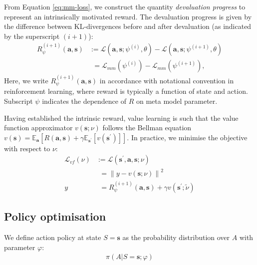 \documentclass[utf8]{frontiersSCNS}
\newcommand{\norm}[1]{\left\lVert#1\right\rVert}
\newcommand{\bs}{\boldsymbol}
\begin{document}
From Equation \ref{eq:mm-loss}, we construct the quantity {\it devaluation progress} to represent an intrinsically motivated reward. The devaluation progress is given by the difference between KL-divergences before and after devaluation (as indicated by the superscript $(i+1)$):
%
	\begin{equation}
	\begin{aligned} \label{eq:deval-prog}
	R_\psi^{(i+1)}(\bs{a}, \bs{s}) 
		&:= 
		\mathcal{L}(\bs{a}, \bs{s}; \psi^{(i)}, \theta) - 
		\mathcal{L}(\bs{a}, \bs{s}; \psi^{(i+1)}, \theta) \\
		&\phantom{:}=	
		\mathcal{L}_{mm}(\psi^{(i)}) - \mathcal{L}_{mm}(\psi^{(i+1)}),
	\end{aligned}
	\end{equation}
%
Here, we write $R_\psi^{(i+1)}(\bs{a}, \bs{s})$ in accordance with notational convention in reinforcement learning, where reward is typically a function of state and action. Subscript $\psi$ indicates the dependence of $R$ on meta model parameter.

Having established the intrinsic reward, value learning is such that the value function approximator $v (\bs{s}; \nu)$ follows the Bellman equation $v(\bs{s}) = \mathbb{E}_{\bs{a}}[R(\bs{a}, \bs{s}) + \gamma \mathbb{E}_{\bs{s}^\prime}[v(\bs{s}^\prime)]]$. In practice, we minimise the objective with respect to $\nu$:
%
	\begin{equation}
	\begin{aligned} \label{eq:vf-loss}
	\mathcal{L}_{vf}(\nu) 
		&:= 
		\mathcal{L}(\bs{s}^\prime, \bs{a}, \bs{s}; \nu) \\ 
		&\phantom{:}= 
		\norm{y - v(\bs{s}; \nu) }^2 \\
		y 
		&\phantom{:}= 
		R_\psi^{(i+1)}(\bs{a}, \bs{s}) + \gamma v(\bs{s}^\prime; \tilde\nu)
	\end{aligned}
	\end{equation}
%

\subsection{Policy optimisation} \label{subsec:policy}

We define action policy at state $S=\bs{s}$ as the probability distribution over $A$ with parameter $\varphi$:
%
	\begin{equation}
	\begin{aligned} \label{eq:policy}
	\pi(A|S=\bs{s}; \varphi)
	\end{aligned}
	\end{equation}
\end{document}
